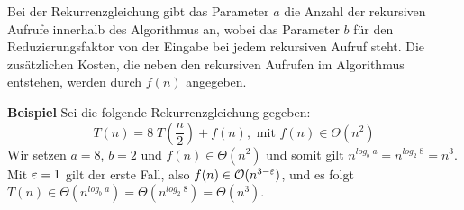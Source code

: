 Bei der Rekurrenzgleichung gibt das Parameter $a$ die Anzahl der rekursiven Aufrufe innerhalb des Algorithmus an, wobei das Parameter $b$ für den Reduzierungsfaktor von der Eingabe bei jedem rekursiven Aufruf steht. Die zusätzlichen Kosten, die neben den rekursiven Aufrufen im Algorithmus entstehen, werden durch $f(n)$ angegeben.

\bigskip
\textbf{Beispiel} Sei die folgende Rekurrenzgleichung gegeben:
\begin{equation}
    T(n) =
    8\; T\left(\frac{n}{2}\right) + f(n),\text{ mit }f(n) \in \Theta(n^{2})\label{eq:equation}
\end{equation}
Wir setzen $a = 8$, $b = 2$ und $f(n) \in \Theta(n^{2})$ und somit gilt $n^{log_b\;a} = n^{log_2\;8} = n^3$.
Mit $\varepsilon = 1$ gilt der erste Fall, also $f(n) \in \mathcal{O}(n^{3-\varepsilon})$, und es folgt $T(n) \in \Theta(n^{log_b\;a}) = \Theta(n^{log_2\;8}) = \Theta(n^{3})$.